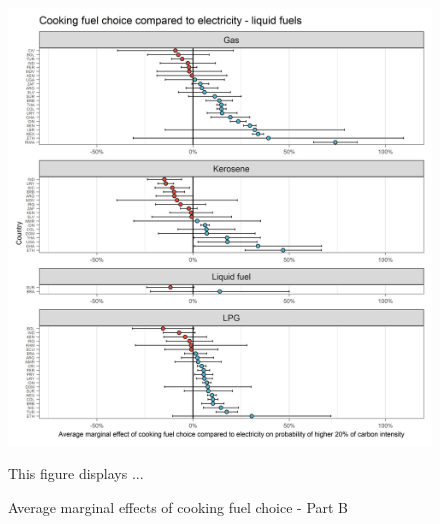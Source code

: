 \documentclass[12pt, a4paper]{article}
\newenvironment{subcaption}
{\strut
\vspace{-5pt}
\begin{minipage}[b]{0.9\textwidth}
  \hspace*{-\parindent}
  \footnotesize}
 {\end{minipage}}
\begin{document}
 \begin{figure}[ht!]
   \centering
   \caption{Average marginal effects of cooking fuel choice - Part B} \label{fig:F7_Electricity_B}
   \includegraphics{Analysis_Logit_Models_Marginal_Effects/Average_Marginal_Effects_affected_upper_80_CF_Electricity B}
   \begin{subcaption}
     This figure displays ...
   \end{subcaption}
 \end{figure}

 \clearpage
\end{document}
